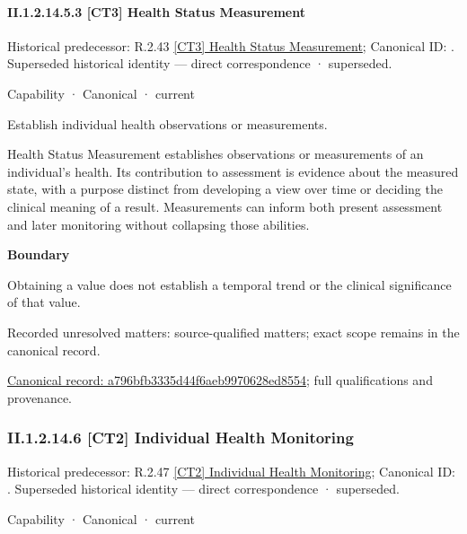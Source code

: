 \paragraph*{II.1.2.14.5.3 [CT3] Health Status Measurement}
\label{navigation:II.1.2.14.5.3}

{\small Historical predecessor: R.2.43 \hyperref[element:3717906f7f8840d3a8a3e3877543dd18]{[CT3] Health Status Measurement}; Canonical ID: \texttt{}. Superseded historical identity — direct correspondence · superseded.}\par
\label{element:a796bfb3335d44f6aeb9970628ed8554}
{\small Capability · Canonical · current}\par

Establish individual health observations or measurements.



Health Status Measurement establishes observations or measurements of an individual's health. Its contribution to assessment is evidence about the measured state, with a purpose distinct from developing a view over time or deciding the clinical meaning of a result. Measurements can inform both present assessment and later monitoring without collapsing those abilities.



\textbf{Boundary}



Obtaining a value does not establish a temporal trend or the clinical significance of that value.


{\small Recorded unresolved matters: source-qualified matters; exact scope remains in the canonical record.}\par
{\footnotesize \href{../../../../../../../continuum/strategy/capability/a796bfb3335d44f6aeb9970628ed8554.md}{Canonical record: a796bfb3335d44f6aeb9970628ed8554}; full qualifications and provenance.}\par
\subsubsection*{II.1.2.14.6 [CT2] Individual Health Monitoring}
\label{navigation:II.1.2.14.6}

{\small Historical predecessor: R.2.47 \hyperref[element:31e7c27556314cafb74d040441d2dac6]{[CT2] Individual Health Monitoring}; Canonical ID: \texttt{}. Superseded historical identity — direct correspondence · superseded.}\par
\label{element:c7d0e498e1ad44138df940af2f91cd2d}
{\small Capability · Canonical · current}\par

